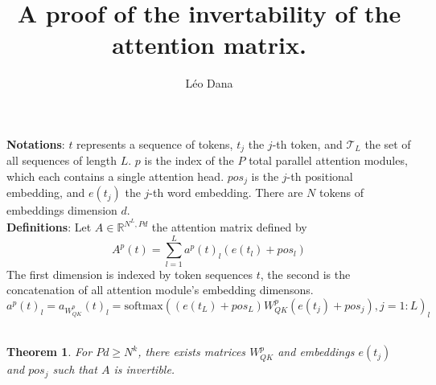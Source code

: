 \documentclass{article}
\newtheorem{theorem}{Theorem}
\begin{document}
\title{A proof of the invertability of the attention matrix. }
\author{Léo Dana}
\date{}

\maketitle

\noindent \textbf{Notations}: $t$ represents a sequence of tokens, $t_j$ the $j$-th token, and $\mathcal{T}_L$ the set of 
all sequences of length $L$. $p$ is the index of the $P$ total parallel attention modules, 
which each contains a single attention head. $pos_j$ is the $j$-th positional embedding, and $e(t_j)$ the $j$-th word embedding.
There are $N$ tokens of embeddings dimension $d$.
\\

\noindent \textbf{Definitions}: Let $A\in\mathbb{R}^{N^L, Pd}$ the attention matrix defined by \[A^{p}(t) = \sum_{l=1}^{L} a^{p}(t)_l (e(t_l)+pos_l)\]
The first dimension is indexed by token sequences $t$, the second is the concatenation of all attention 
module's embedding dimensons. \[a^{p}(t)_l = a_{W_{QK}^p}(t)_l = \text{softmax}((e(t_L)+pos_L)W_{QK}^p(e(t_j)+pos_j), j=1:L)_l\]
\\

\begin{theorem}
    For $Pd \geq N^k$, there exists matrices $W_{QK}^p$ and embeddings $e(t_j)$ and $pos_j$ such that $A$ is invertible.
    \\
\end{theorem}
\end{document}
